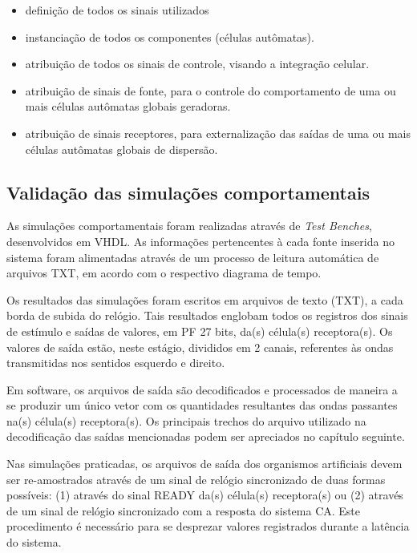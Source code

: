 \begin{description}
    \begin{itemize}
        \item definição de todos os sinais utilizados
	    \item instanciação de todos os componentes (células autômatas). 
	    \item atribuição de todos os sinais de controle, visando a integração celular.
	    \item atribuição de sinais de fonte, para o controle do comportamento de uma ou mais células autômatas globais geradoras. 
	    \item atribuição de sinais receptores, para externalização das saídas de uma ou mais células autômatas globais de dispersão.
	 \end{itemize}
\end{description}

\subsection{Validação das simulações comportamentais}

As simulações comportamentais foram realizadas através de \textit{Test Benches}, desenvolvidos em VHDL. As informações pertencentes à cada fonte inserida no sistema foram alimentadas através de um processo de leitura automática de arquivos TXT, em acordo com o respectivo diagrama de tempo.

Os resultados das simulações foram escritos em arquivos de texto (TXT), a cada borda de subida do relógio. Tais resultados englobam todos os registros dos sinais de estímulo e saídas de valores, em PF 27 bits, da(s) célula(s) receptora(s). Os valores de saída estão, neste estágio, divididos em 2 canais, referentes às ondas transmitidas nos sentidos esquerdo e direito.

Em software, os arquivos de saída são decodificados e processados de maneira a se produzir um único vetor com os quantidades resultantes das ondas passantes na(s) célula(s) receptora(s). Os principais trechos do arquivo utilizado na decodificação das saídas mencionadas podem ser apreciados no capítulo seguinte.

Nas simulações praticadas, os arquivos de saída dos organismos artificiais devem ser re-amostrados através de um sinal de relógio sincronizado de duas formas possíveis: (1) através do sinal READY da(s) célula(s) receptora(s) ou (2) através de um sinal de relógio sincronizado com a resposta do sistema CA. Este procedimento é necessário para se desprezar valores registrados durante a latência do sistema. 

